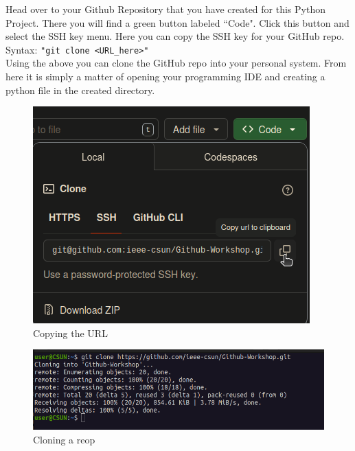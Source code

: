 \documentclass[12pt, a4paper]{article}
\begin{document}
Head over to your Github Repository that you have created for this Python Project. There you will find a green button labeled ``Code". Click this button and select the SSH key menu. Here you can copy the SSH key for your GitHub repo. \\

Syntax: \verb+"git clone <URL_here>"+ \\

Using the above you can clone the GitHub repo into your personal system. From here it is simply a matter of opening your programming IDE and creating a python file in the created directory.
\begin{figure}[H]
\centering
\includegraphics[scale=0.5]{../images/workshop-I/GH-URL.png}
\caption{Copying the URL}
\end{figure}
\begin{figure}[H]
\centering
\includegraphics[scale=0.5]{../images/workshop-I/git-clone.png}
\caption{Cloning a reop}
\end{figure}
\end{document}
